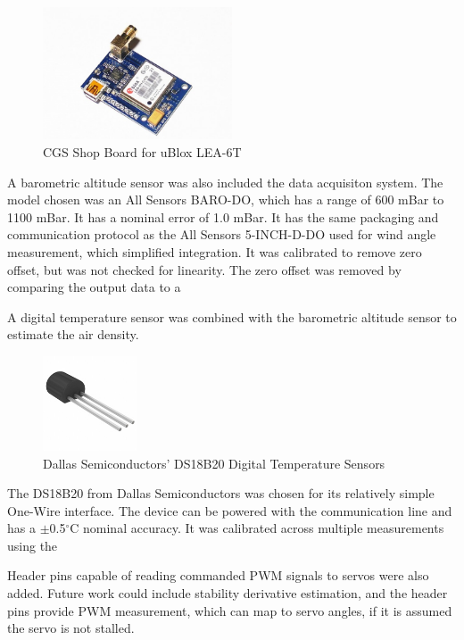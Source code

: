 \begin{figure}[H]
  \caption{CGS Shop Board for uBlox LEA-6T} \label{gpsPicture}
  \centering
    \includegraphics[width=0.5\textwidth]{figures/gpsBoard.jpg}
\end{figure}

A barometric altitude sensor was also included the data acquisiton system. The model chosen was an All Sensors BARO-DO, which has a range of 600 mBar to 1100 mBar\cite{allSensorsBaroDatasheet}. It has a nominal error of 1.0 mBar. It has the same packaging and communication protocol as the All Sensors 5-INCH-D-DO used for wind angle measurement, which simplified integration. It was calibrated to remove zero offset, but was not checked for linearity. The zero offset was removed by comparing the output data to a %

A digital temperature sensor was combined with the barometric altitude sensor to estimate the air density.
\begin{figure}[H]
  \caption{Dallas Semiconductors' DS18B20 Digital Temperature Sensors} \label{ds18b20Picture}
  \centering
    \includegraphics[width=0.25\textwidth]{figures/ds18b20Picture.jpg}
\end{figure}
 The DS18B20 from Dallas Semiconductors was chosen for its relatively simple One-Wire interface. The device can be powered with the communication line and has a $\pm$0.5$^\circ$C nominal accuracy\cite{DS18B20Datasheet}. It was calibrated across multiple measurements using the %

Header pins capable of reading commanded PWM signals to servos were also added. Future work could include stability derivative estimation, and the header pins provide PWM measurement, which can map to servo angles, if it is assumed the servo is not stalled. 

